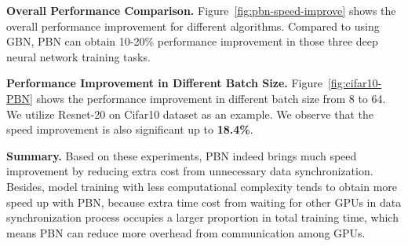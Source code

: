 \documentclass{llncs}
\begin{document}

{\bf Overall Performance Comparison. } Figure~\ref{fig:pbn-speed-improve} shows the overall performance improvement for different algorithms. Compared to using  GBN, PBN can obtain 10-20\% performance improvement 
in those three deep neural network training tasks. 

{\bf Performance Improvement in Different Batch Size. }
Figure~\ref{fig:cifar10-PBN} shows the performance improvement in different batch size from 8 to 64. We utilize Resnet-20 on Cifar10 dataset as an example. We observe that the speed improvement is also significant up to \textbf{18.4\%}.

{\bf Summary.} Based on these experiments, PBN indeed brings much speed improvement by reducing extra cost from unnecessary data synchronization. Besides, model training with less computational complexity tends to obtain more speed up with  PBN, because extra time cost from waiting for other GPUs in data synchronization process occupies a larger proportion in total training time, which means PBN can reduce more overhead from communication among GPUs.
\end{document}
